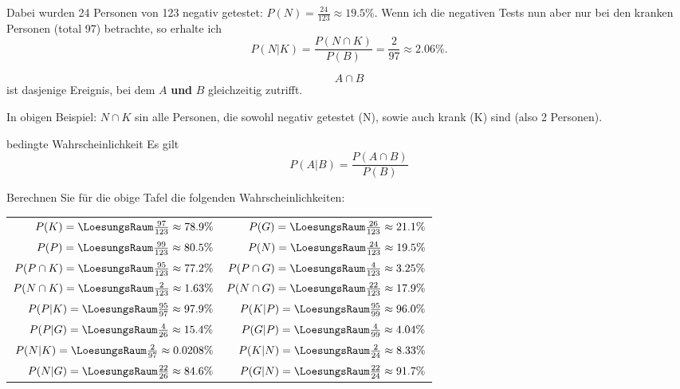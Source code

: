 Dabei wurden 24 Personen von 123 negativ getestet: $P(N) =
\frac{24}{123}\approx 19.5\%$.
Wenn ich die negativen Tests nun aber nur bei den kranken Personen
(total 97) betrachte, so erhalte ich
$$P(N|K) = \frac{P(N\cap K)}{P(B)} = \frac{2}{97} \approx 2.06\%.$$

\begin{definition}{}{}
$$A\cap B$$ ist dasjenige Ereignis, bei dem $A$ \textbf{und} $B$
gleichzeitig zutrifft.
\end{definition}

In obigen Beispiel: $N\cap K$ sin alle Personen, die sowohl negativ
getestet (N), sowie auch krank (K) sind (also 2 Personen).

\begin{gesetz}{bedingte Wahrscheinlichkeit}{}
  Es gilt
  $$P(A|B) = \frac{P(A\cap B)}{P(B)}$$
\end{gesetz}

Berechnen Sie für die obige Tafel die folgenden Wahrscheinlichkeiten:

\begin{tabular}{rr}
$P(K) = \LoesungsRaum{\frac{97}{123} \approx{} 78.9\%}$&
$P(G) = \LoesungsRaum{\frac{26}{123} \approx{} 21.1\%}$\\
$P(P) = \LoesungsRaum{\frac{99}{123} \approx{} 80.5\%}$&
$P(N) = \LoesungsRaum{\frac{24}{123} \approx{} 19.5\%}$\\


$P(P\cap K) = \LoesungsRaum{\frac{95}{123} \approx{} 77.2\%}$&
$P(P\cap G) = \LoesungsRaum{\frac{4}{123}  \approx{} 3.25\%}$\\
$P(N\cap K) = \LoesungsRaum{\frac{2}{123}  \approx{} 1.63\%}$&
$P(N\cap G) = \LoesungsRaum{\frac{22}{123} \approx{} 17.9\%}$\\

$P(P|K) = \LoesungsRaum{\frac{95}{97} \approx{} 97.9\%}$&
$P(K|P) = \LoesungsRaum{\frac{95}{99} \approx{} 96.0\%}$\\

$P(P|G) = \LoesungsRaum{\frac{4}{26} \approx{} 15.4\%}$&
$P(G|P) = \LoesungsRaum{\frac{4}{99} \approx{} 4.04\%}$\\

$P(N|K) = \LoesungsRaum{\frac{2}{97} \approx{} 0.0208\%}$&
$P(K|N) = \LoesungsRaum{\frac{2}{24} \approx{} 8.33\%}$\\

$P(N|G) = \LoesungsRaum{\frac{22}{26} \approx{}  84.6\%}$&
$P(G|N) = \LoesungsRaum{\frac{22}{24} \approx{} 91.7\%}$\\
\end{tabular}
\newpage
